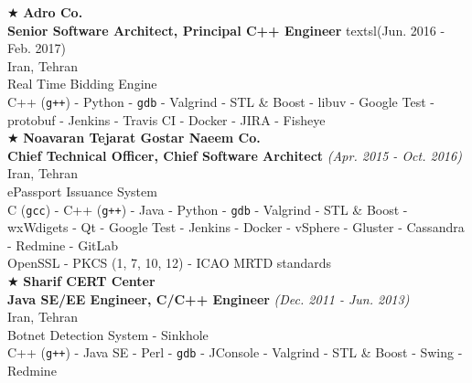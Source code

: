 \documentclass[10pt,a4paper]{article}
\begin{document}
\noindent $\bigstar$ \hspace{0.1cm} \large \textbf{Adro Co.} \\
\indent \small \textbf{Senior Software Architect, Principal C++ Engineer} textsl{(Jun. 2016 - Feb. 2017)} \\
\indent \textnormal{Iran, Tehran} \\
\indent \textbullet \hspace{0.05cm} Real Time Bidding Engine \\
\indent \textbullet \hspace{0.05cm} C++ (\texttt{g++}) - Python - \texttt{gdb} - Valgrind - STL \& Boost - libuv - Google Test - protobuf - Jenkins - Travis CI - Docker - JIRA - Fisheye \\

\noindent $\bigstar$ \hspace{0.1cm} \large \textbf{Noavaran Tejarat Gostar Naeem Co.} \\
\indent \small \textbf{Chief Technical Officer, Chief Software Architect} \textsl{(Apr. 2015 - Oct. 2016)} \\
\indent \textnormal{Iran, Tehran} \\
\indent \textbullet \hspace{0.05cm} ePassport Issuance System \\
\indent \textbullet \hspace{0.05cm} C (\texttt{gcc}) - C++ (\texttt{g++}) - Java - Python - \texttt{gdb} - Valgrind - STL \& Boost - wxWdigets - Qt - Google Test - Jenkins - Docker - vSphere - Gluster - Cassandra - Redmine - GitLab \\
\indent \textbullet \hspace{0.05cm} OpenSSL - PKCS (1, 7, 10, 12) - ICAO MRTD standards \\

\noindent $\bigstar$ \hspace{0.1cm} \large \textbf{Sharif CERT Center} \\ 
\indent \small \textbf{Java SE/EE Engineer, C/C++ Engineer} \textsl{(Dec. 2011 - Jun. 2013)} \\
\indent \textnormal{Iran, Tehran} \\ 
\indent \textbullet \hspace{0.05cm} Botnet Detection System - Sinkhole \\
\indent \textbullet \hspace{0.05cm} C++ (\texttt{g++}) - Java SE - Perl - \texttt{gdb} - JConsole - Valgrind - STL \& Boost - Swing - Redmine \\
\end{document}
